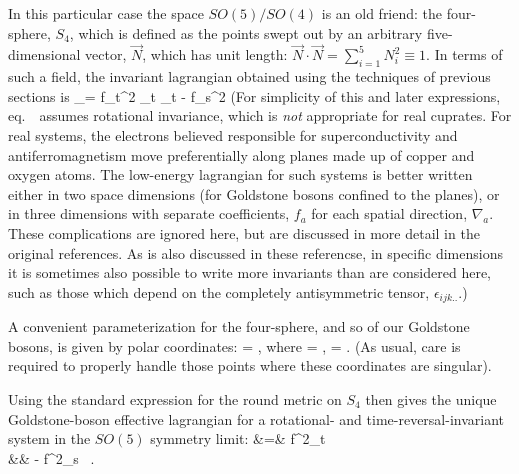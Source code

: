 In this particular case the space $SO(5)/SO(4)$ is an old
friend: the four-sphere, $S_4$, which is defined as the
points swept out by an arbitrary five-dimensional vector,
$\vec{N}$, which has unit length: $\vec{N} \cdot \vec{N} =
\sum_{i=1}^5 N_i^2 \equiv 1$. In terms of such a field, the
invariant lagrangian obtained using the techniques of
previous sections is
%
\eq
\label{simpinvlagr}
\Scl_\inv = {f_t^2 } \;
\partial_t  \cdot  \partial_t
  - {f_s^2 } \; \nabla
{} \cdot  \nabla  {}
\eeq
%
(For simplicity of this and later expressions, 
eq.~\ assumes rotational invariance,
which is 
{\it not} appropriate for real cuprates. For real systems,
the electrons believed responsible for superconductivity
and antiferromagnetism move preferentially along planes
made up of copper and oxygen atoms. The low-energy
lagrangian for such systems is better written either in two
space dimensions (for Goldstone bosons confined to the
planes), or in three dimensions with separate coefficients,
$f_a$ for each spatial direction, 
$\nabla_a$. These complications are ignored here, but are
discussed in more detail in the original references. As is
also discussed in these referencse, in specific dimensions
it is sometimes also possible to write more invariants than
are considered here, such as those which depend on the
completely antisymmetric tensor, $\epsilon_{ijk..}$.)

A convenient parameterization for the four-sphere, and so
of our Goldstone bosons, is given by polar coordinates:
%
\eq
\label{explangles}
 = \pmatrix{\nq \cr \ns \cr}, 
\qquad \hbox{where}
\qquad
\nq = \cos\theta  \pmatrix{\cos\phi 
\cr \sin\phi \cr}, \qquad
\ns = \sin\theta \pmatrix{ \sin\alpha 
\cos\beta \cr  \sin\alpha \sin\beta \cr
\cos\alpha\cr} .
\eeq
%
(As usual, care is required to properly handle those points
where these coordinates are singular).

Using the standard expression for the round metric on $S_4$
then gives the unique Goldstone-boson effective lagrangian
for a rotational- and time-reversal-invariant system in the
$SO(5)$ symmetry limit:
%
\bg
\label{kintermanglesinv}
\Scl &=& {f^2_t }  \nn\\
&& \qquad \qquad - \;  {f^2_s } \;  \, .\nn
\nd


